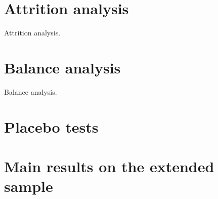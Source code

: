 \clearpage
\section{Attrition analysis}\label{app:attrition}

\begin{table}[h!]\label{tab:attrition}
    \caption[Attrition analysis]{Attrition analysis.} 
    \makebox[\textwidth][c]{\resizebox*{!}{.87\textheight}{ %
        }}
\end{table}

\clearpage
\section{Balance analysis}\label{app:balance}

\begin{table}[h]\label{tab:balance}
    \caption[Balance analysis]{Balance analysis.} 
    \makebox[\textwidth][c]{
\resizebox*{!}{.72\textheight}{ %
        
        }
    }
\end{table}
\clearpage

\section{Placebo tests}\label{app:placebo}

%         

\section{Main results on the extended sample}\label{app:extended}


